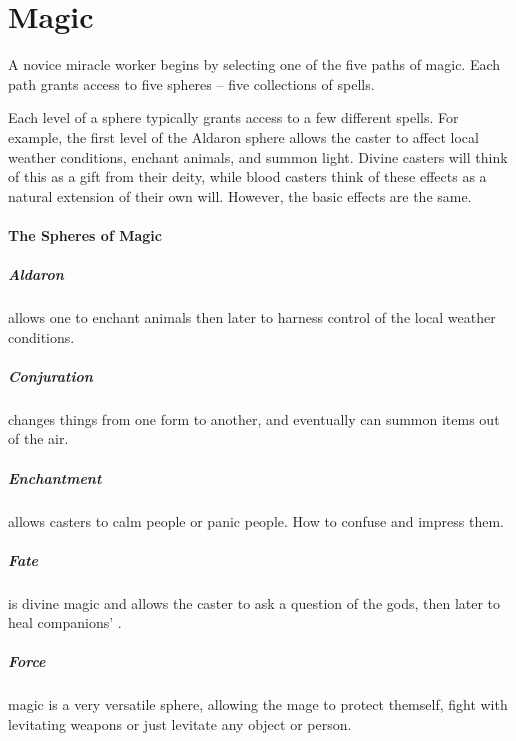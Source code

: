 \chapter{Magic}

\begin{multicols}{2}

\noindent
A novice miracle worker begins by selecting one of the five paths of magic.
Each path grants access to five spheres -- five collections of spells.

Each level of a sphere typically grants access to a few different spells.
For example, the first level of the Aldaron sphere allows the caster to affect local weather conditions, enchant animals, and summon light.
Divine casters will think of this as a gift from their deity, while blood casters think of these effects as a natural extension of their own will.
However, the basic effects are the same.

\subsubsection{The Spheres of Magic}

\paragraph{Aldaron} allows one to enchant animals then later to harness control of the local weather conditions.

\paragraph{Conjuration} changes things from one form to another, and eventually can summon items out of the air.

\paragraph{Enchantment} allows casters to calm people or panic people. How to confuse and impress them.

\paragraph{Fate} is divine magic and allows the caster to ask a question of the gods, then later to heal companions' .

\paragraph{Force} magic is a very versatile sphere, allowing the mage to protect themself, fight with levitating weapons or just levitate any object or person.


\end{multicols}
